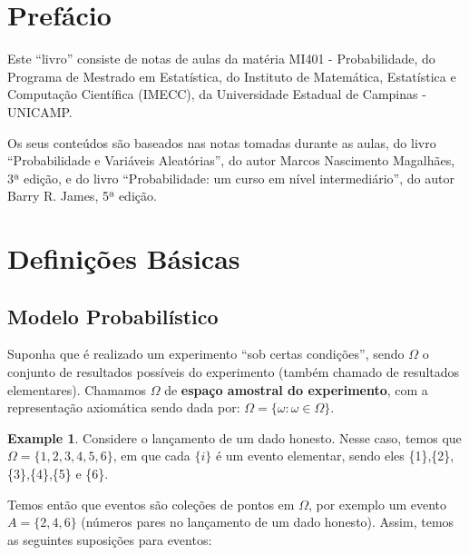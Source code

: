 \documentclass[
]{article}
\theoremstyle{definition}
\theoremstyle{definition}
\newtheorem{example}{Example}[section]
\theoremstyle{definition}
\theoremstyle{definition}
\theoremstyle{remark}
\begin{document}
\cleardoublepage

\renewcommand*\contentsname{Conteúdos}
{
\setcounter{tocdepth}{2}
\tableofcontents
}
\newpage

\hypertarget{prefuxe1cio}{%
\section{Prefácio}\label{prefuxe1cio}}

Este ``livro'' consiste de notas de aulas da matéria MI401 - Probabilidade, do Programa de Mestrado em Estatística, do Instituto de Matemática, Estatística e Computação Científica (IMECC), da Universidade Estadual de Campinas - UNICAMP.

Os seus conteúdos são baseados nas notas tomadas durante as aulas, do livro ``Probabilidade e Variáveis Aleatórias'', do autor Marcos Nascimento Magalhães, 3ª edição, e do livro ``Probabilidade: um curso em nível intermediário'', do autor Barry R. James, 5ª edição.

\newpage

\hypertarget{definiuxe7uxf5es-buxe1sicas}{%
\section{Definições Básicas}\label{definiuxe7uxf5es-buxe1sicas}}

\hypertarget{modelo-probabiluxedstico}{%
\subsection{Modelo Probabilístico}\label{modelo-probabiluxedstico}}

Suponha que é realizado um experimento ``sob certas condições'', sendo \textbf{\(\Omega\)} o conjunto de resultados possíveis do experimento (também chamado de resultados elementares). Chamamos \textbf{\(\Omega\)} de \textbf{espaço amostral do experimento}, com a representação axiomática sendo dada por: \(\Omega = \{\omega : \omega \in \Omega\}\).

\begin{example}
Considere o lançamento de um dado honesto. Nesse caso, temos que \(\Omega = \{1,2,3,4,5,6\}\), em que cada \(\{i\}\) é um evento elementar, sendo eles \{1\},\{2\},\{3\},\{4\},\{5\} e \{6\}.
\end{example}

Temos então que eventos são coleções de pontos em \(\Omega\), por exemplo um evento \(A = \{2,4,6\}\) (números pares no lançamento de um dado honesto). Assim, temos as seguintes suposições para eventos:
\end{document}
